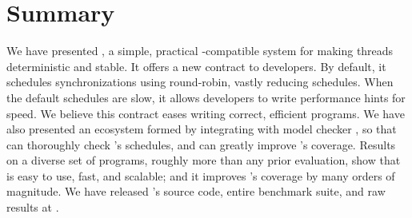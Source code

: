 \vspace{-.05in}
\section{Summary} \label{sec:parrot-summary}
\vspace{-.05in}

We have presented \parrot, a simple, practical \pthread-compatible system for
making threads deterministic and stable. It offers a new contract to
developers.  By default, it schedules synchronizations using round-robin,
vastly reducing schedules.  When the default schedules are slow, it
allows developers to write performance hints for speed.  We believe this
contract eases writing correct, efficient programs.  We have
also presented an ecosystem formed by integrating \parrot with model checker
\dbug, so that \dbug can thoroughly check \parrot's schedules, and \parrot can
greatly improve \dbug's coverage.  Results on a diverse set of \nprog
programs, roughly \overeach more than any prior evaluation,
show that \parrot is easy to use, fast, and scalable; and it improves \dbug's
coverage by many orders of magnitude.  We have released \parrot's source
code, entire benchmark suite, and raw results at \github.
